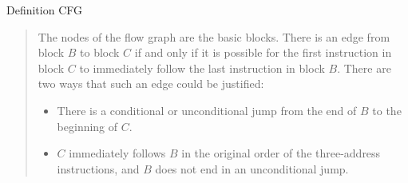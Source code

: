 \documentclass[aspectratio=169, xcolor=dvipsnames]{beamer}
\begin{document}
\begin{frame}{Definition CFG}
    \begin{quotation}\noindent
        \grqq The nodes of the flow graph are the basic blocks.
        There is an edge from block \(B\) to block \(C\) if and only if it is possible for the first instruction in block \(C\) to immediately follow the last instruction in block \(B\).
        There are two ways that such an edge could be justified:
        \begin{itemize}
            \item There is a conditional or unconditional jump from the end of \(B\) to the beginning of \(C\).
            \item \(C\) immediately follows \(B\) in the original order of the three-address instructions, and \(B\) does not end in an unconditional jump.\grqq
        \end{itemize}
    \end{quotation}
\end{frame}
\end{document}
